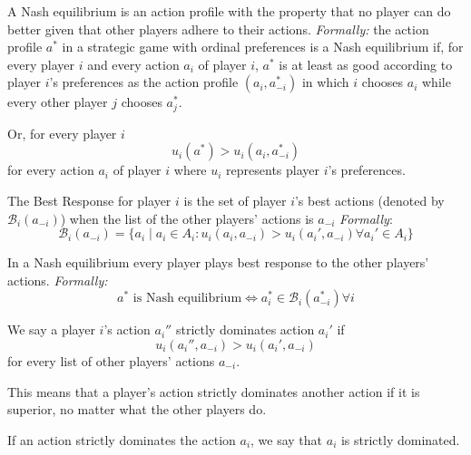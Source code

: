 \begin{definition}
      A Nash equilibrium is an action profile with the property that no player can do better given that other players adhere to their actions.
      \textit{Formally:} the action profile $a^*$ in a strategic game with ordinal preferences is a Nash
      equilibrium if, for every player $i$ and every action $a_i$ of player $i$, $a^*$ is at least as good
      according to player $i$'s preferences as the action profile $(a_i , a^*_{-i})$ in which $i$ chooses $a_i$
      while every other player $j$ chooses $a^*_j$.

      Or, for every player $i$
      \[
            u_i (a^*) > u_i(a_i , a^*_{-i} )
      \]
      for every action $a_i$ of player $i$ where $u_i$ represents player $i$'s preferences.
\end{definition}

\begin{definition}
      The Best Response for player $i$ is the set of player $i$'s best actions (denoted by $\mathcal{B}_i (a_{-i})$) when the list of the other
      players' actions is $a_{-i}$
      \textit{Formally}:
      \[
            \mathcal{B}_i (a_{-i}) = \{a_i \mid a_i \in A_i : u_i (a_i ,a_{-i} ) > u_i (a_i' ,a_{-i} )  \forall a_i' \in A_i\}
      \]
\end{definition}
\begin{corollary}
      In a Nash equilibrium every player plays best response to the other players' actions. \textit{Formally:}
      \[
            a^* \text{ is Nash equilibrium} \iff a^*_i \in \mathcal{B}_i (a^*_{-i} ) \forall i
      \]
\end{corollary}


\begin{definition}
      We say a player $i$'s action $a_i''$ strictly dominates action $a_i'$ if
      \[u_i (a_i'' , a_{-i} ) > u_i (a_i' , a_{-i} )\]
      for every list of other players' actions $a_{-i}$. 
      
      This means that a player’s action strictly dominates another action if it 
      is superior, no matter what the other players do.
\end{definition}


\begin{definition}
      If an action strictly dominates the action $a_i$, we say that $a_i$ is strictly dominated.
\end{definition}


